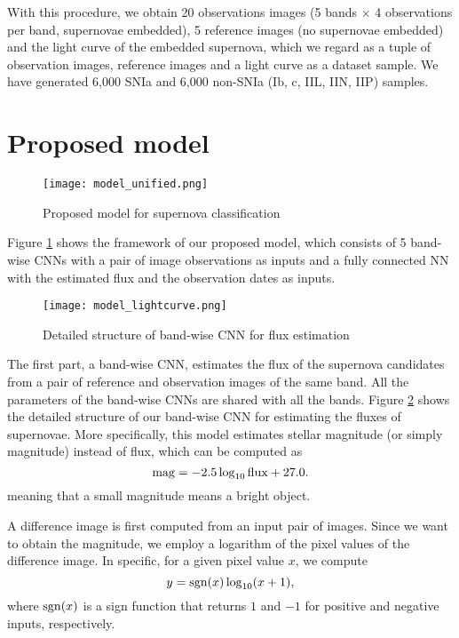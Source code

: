 \documentclass[conference,compsoc]{IEEEtran}
\begin{document}
  With this procedure, we obtain 20 observations images (5 bands $\times$ 4 observations per band, supernovae embedded), 5 reference images (no supernovae embedded) and the light curve of the embedded supernova, which we regard as a tuple of observation images, reference images and a light curve as a dataset sample.
  We have generated 6,000 SNIa and 6,000 non-SNIa (Ib, c, IIL, IIN, IIP) samples.


\section{Proposed model}
\label{sec:model}

\begin{figure}[t]
  \begin{center}
    \texttt{[image: model\_unified.png]}
    \end{center}
  \caption{Proposed model for supernova classification}
  \label{fig:model_unified}
\end{figure}

  Figure \ref{fig:model_unified} shows the framework of our proposed model, which consists of 5 band-wise CNNs with a pair of image observations as inputs and a fully connected NN with the estimated flux and the observation dates as inputs.

\begin{figure}[t]
  \begin{center}
    \texttt{[image: model\_lightcurve.png]}
  \end{center}
  \caption{Detailed structure of band-wise CNN for flux estimation}
  \label{fig:model_lightcurve}
\end{figure}

  The first part, a band-wise CNN, estimates the flux of the supernova candidates from a pair of reference and observation images of the same band.
  All the parameters of the band-wise CNNs are shared with all the bands.
  Figure \ref{fig:model_lightcurve} shows the detailed structure of our band-wise CNN for estimating the fluxes of supernovae.
  More specifically, this model estimates stellar magnitude (or simply magnitude) instead of flux, which can be computed as
\[
  {\rm mag} = -2.5\log_{10}{\rm flux} + 27.0.
\]
meaning that a small magnitude means a bright object.

  A difference image is first computed from an input pair of images.
  Since we want to obtain the magnitude, we employ a logarithm of the pixel values of the difference image.
  In specific, for a given pixel value $x$, we compute
\[
  y = {\rm sgn}(x)\log_{10}(x+1),
\]
where ${\rm sgn}(x)$ is a sign function that returns $1$ and $-1$ for positive and negative inputs, respectively.
\end{document}
